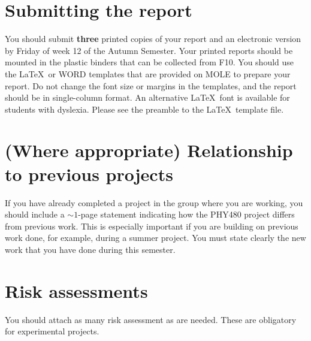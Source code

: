 \documentclass[a4paper,11pt]{article}
\begin{document}
\section{Submitting the report}

You should submit \textbf{three} printed copies of your report and an electronic version by Friday of week 12 of the Autumn Semester. Your printed reports should be mounted in the plastic binders that can be collected from F10. You should use the \LaTeX\ or WORD templates that are provided on MOLE to prepare your report. Do not change the font size or margins in the templates, and the report should be in single-column format. An alternative \LaTeX\  font is available for students with dyslexia. Please see the preamble to the \LaTeX\  template file.





\newpage






\newpage 
\begin{appendix}

\section{(Where appropriate) Relationship to previous projects}
If you have already completed a project in the group where you are working, you should include a $\sim 1$-page statement indicating how the PHY480 project differs from previous work. This is especially important if you are building on previous work done, for example, during a summer project. You must state clearly the new work that you have done during this semester.
\newpage

\section{Risk assessments}
You should attach as many risk assessment as are needed. These are obligatory for experimental projects.

\end{appendix}
\end{document}
